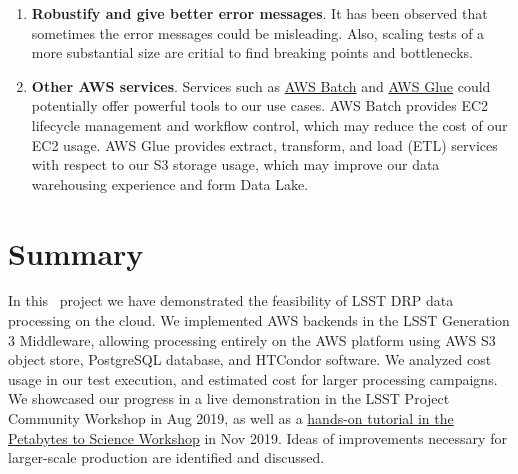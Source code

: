 \begin{enumerate}
\item \textbf{Robustify and give better error messages}.
It has been observed that sometimes the error messages could be misleading.
Also, scaling tests of a more substantial size are critial to find breaking points and bottlenecks.
\item \textbf{Other AWS services}.
Services such as \href{https://aws.amazon.com/batch/}{AWS Batch} and \href{https://aws.amazon.com/glue/}{AWS Glue} could potentially offer powerful tools to our use cases.
AWS Batch provides EC2 lifecycle management and workflow control, which may reduce the cost of our EC2 usage.
AWS Glue provides extract, transform, and load (ETL) services with respect to our S3 storage usage, which may improve our data warehousing experience and form Data Lake.

\end{enumerate}

\section{Summary}

In this \poc~project we have demonstrated the feasibility of LSST DRP data processing on the cloud.
We implemented AWS backends in the LSST Generation 3 Middleware, allowing processing entirely on the AWS platform using AWS S3 object store, PostgreSQL database, and HTCondor software.
We analyzed cost usage in our test execution, and estimated cost for larger processing campaigns.
We showcased our progress in a live demonstration in the LSST Project Community Workshop in Aug 2019, as well as a \href{https://confluence.lsstcorp.org/display/DM/Tutorials+at+the+Kavli+workshop}{hands-on tutorial in the Petabytes to Science Workshop} in Nov 2019.
Ideas of improvements necessary for larger-scale production are identified and discussed.
